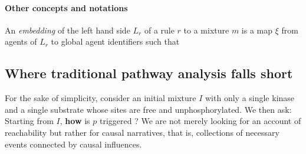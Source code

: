 



\paragraph{Other concepts and notations}

An \emph{embedding} of the left hand side $L_r$ of a rule $r$ to a mixture $m$
is a map $\xi$ from agents of $L_r$ to global agent identifiers such that







%




\subsection{Where traditional pathway analysis falls short}



For the sake of simplicity, consider an initial mixture $I$ with only
a single kinase and a single substrate whose sites are free and
unphosphorylated. We then ask: Starting from $I$, \textbf{how} is $p$
triggered ? We are not merely looking for an account of reachability
but rather for causal narratives, that is, collections of necessary
events connected by causal influences. 

